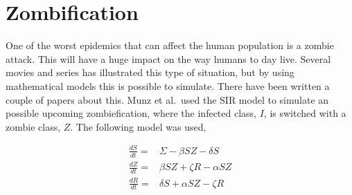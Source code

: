 \documentclass[%
twoside,                 %
final,                   %
10pt]{article}
\begin{document}
\section{Zombification}
One of the worst epidemics that can affect the human population is a zombie attack. This will have a huge impact on the way humans to day live. Several movies and series has illustrated this type of situation, but by using mathematical models this is possible to simulate. There have been written a couple of papers about this.  Munz et al.~used  the SIR model to simulate an possible upcoming zombiefication, where the infected class, $I$, is switched with a zombie class, $Z$. The following model was used,

\begin{align*}
\frac{dS}{dt} =& \Sigma -\beta SZ - \delta S \\
\frac{dZ}{dt} =& \beta SZ + \zeta R - \alpha SZ\\
\frac{dR}{dt} =& \delta S + \alpha SZ - \zeta R
\end{align*}
\end{document}
